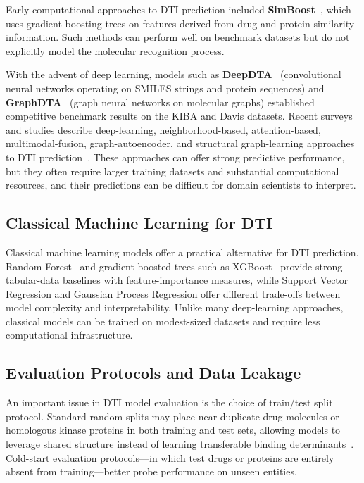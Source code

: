 \documentclass[10pt,conference]{IEEEtran}
\begin{document}
Early computational approaches to DTI prediction included \textbf{SimBoost}~\cite{simboost}, which uses gradient boosting trees on features derived from drug and protein similarity information. Such methods can perform well on benchmark datasets but do not explicitly model the molecular recognition process.

With the advent of deep learning, models such as \textbf{DeepDTA}~\cite{deepdta} (convolutional neural networks operating on SMILES strings and protein sequences) and \textbf{GraphDTA}~\cite{graphdta} (graph neural networks on molecular graphs) established competitive benchmark results on the KIBA and Davis datasets. Recent surveys and studies describe deep-learning, neighborhood-based, attention-based, multimodal-fusion, graph-autoencoder, and structural graph-learning approaches to DTI prediction~\cite{rajaei2025,byeon2025,reddy2023,liu2024,wang2022,ma2022,wang2023,wang2025,li2024}. These approaches can offer strong predictive performance, but they often require larger training datasets and substantial computational resources, and their predictions can be difficult for domain scientists to interpret.

\subsection{Classical Machine Learning for DTI}

Classical machine learning models offer a practical alternative for DTI prediction. Random Forest~\cite{breiman2001} and gradient-boosted trees such as XGBoost~\cite{chen2016} provide strong tabular-data baselines with feature-importance measures, while Support Vector Regression and Gaussian Process Regression offer different trade-offs between model complexity and interpretability. Unlike many deep-learning approaches, classical models can be trained on modest-sized datasets and require less computational infrastructure.

\subsection{Evaluation Protocols and Data Leakage}

An important issue in DTI model evaluation is the choice of train/test split protocol. Standard random splits may place near-duplicate drug molecules or homologous kinase proteins in both training and test sets, allowing models to leverage shared structure instead of learning transferable binding determinants~\cite{pahikkala2015,park2012}. Cold-start evaluation protocols---in which test drugs or proteins are entirely absent from training---better probe performance on unseen entities.
\end{document}
